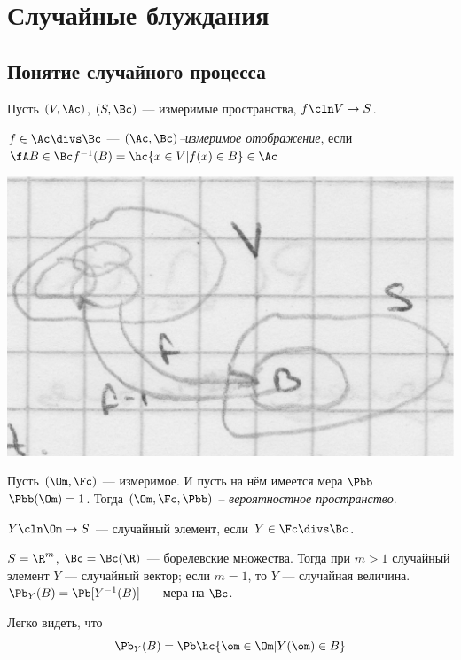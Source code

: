 \chapter{Случайные блуждания}

\section{Понятие случайного процесса}
\begin{df}
	Пусть $(V, \Ac)$, $(S, \Bc)$ --- измеримые пространства, $f \cln V \to S$.

	$f \in \Ac \divs \Bc$ --- \textit{$(\Ac, \Bc)$--измеримое отображение}, если
	$\fA B \in \Bc f^{-1}(B) = \hc{x \in V | f(x) \in B} \in \Ac$

	\includegraphics[scale = .3]{p0-01.eps}

	Пусть $(\Om, \Fc)$ --- измеримое.
	И пусть на нём имеется мера $\Pbb$ \sth $\Pbb(\Om) = 1$.
	Тогда $(\Om, \Fc, \Pbb)$ -- \textit{вероятностное пространство}.

	$Y \cln \Om \to S$ --- случайный элемент, если $Y \in \Fc \divs \Bc$.
\end{df}
\begin{ex}
	$S = \R^m$, $\Bc = \Bc(\R)$ --- борелевские множества.
	Тогда при $m > 1$ случайный элемент $Y$ --- случайный вектор;
	если $m = 1$, то $Y$ --- случайная величина.
	$\Pb_Y(B) = \Pb[Y^{-1}(B)]$ --- мера на $\Bc$.

	Легко видеть, что
	$$
		\Pb_Y(B) = \Pb\hc{\om \in \Om | Y(\om) \in B}
	$$
\end{ex}
